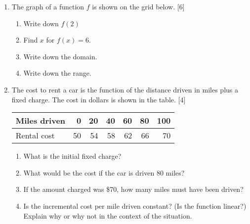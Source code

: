 \documentclass[12pt, twoside]{article}
\begin{document}
\begin{enumerate}
\newpage
\item The graph of a function $f$ is shown on the grid below. \hfill [6]
\begin{multicols}{2}
\begin{enumerate}
  \item Write down $f(2)$
  \item Find $x$ for $f(x)=6$.
  \vspace{0.25cm}
  \item Write down the domain.
  \item Write down the range. \vspace{1cm}
\end{enumerate}
\end{multicols}
\vspace{0.5cm}

\item The cost to rent a car is the function of the distance driven in miles plus a fixed charge. The cost in dollars is shown in the table. \hfill [4]
\begin{center}
  \begin{tabular}{|l|r|r|r|r|r|r|}
    \hline
    Miles driven & 0 & 20 & 40 & 60 & 80 & 100\\ 
    \hline 
    Rental cost & 50 & 54 & 58 & 62 & 66 & 70\\ 
    \hline 
  \end{tabular}
\end{center}
\begin{enumerate}[itemsep=1cm]
  \item What is the initial fixed charge?
  \item What would be the cost if the car is driven 80 miles?
  \item If the amount charged was \$70, how many miles must have been driven?
  \item Is the incremental cost per mile driven constant? (Is the function linear?) Explain why or why not in the context of the situation.
\end{enumerate}


\end{enumerate}
\end{document}
